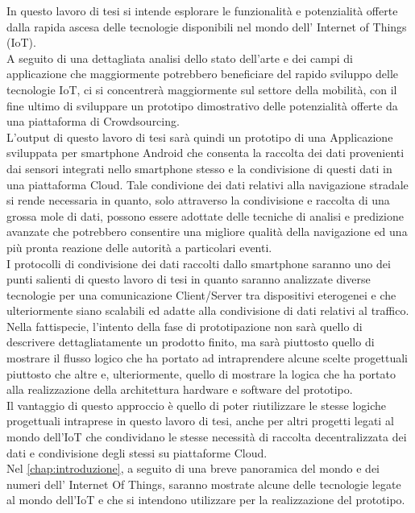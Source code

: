 \documentclass[11pt]{toptesi}
\begin{document}
\sommario
In questo lavoro di tesi si intende esplorare le funzionalità e potenzialità offerte dalla rapida ascesa delle tecnologie disponibili nel mondo dell' Internet of Things (IoT). \\
A seguito di una dettagliata analisi dello stato dell'arte e dei campi di applicazione che maggiormente potrebbero beneficiare del rapido sviluppo delle tecnologie IoT, ci si concentrerà maggiormente sul settore della mobilità, con il fine ultimo di sviluppare un prototipo dimostrativo delle potenzialità offerte da una piattaforma di Crowdsourcing.\\
L'output di questo lavoro di tesi sarà quindi un prototipo di una Applicazione sviluppata per smartphone Android che consenta la raccolta dei dati provenienti dai sensori integrati nello smartphone stesso e la condivisione di questi dati in una piattaforma Cloud. Tale condivione dei dati relativi alla navigazione stradale si rende necessaria in quanto, solo attraverso la condivisione e raccolta di una grossa mole di dati, possono essere adottate delle tecniche di analisi e predizione avanzate che potrebbero consentire una migliore qualità della navigazione ed una più pronta reazione delle autorità a particolari eventi.\\
I protocolli di condivisione dei dati raccolti dallo smartphone saranno uno dei punti salienti di questo lavoro di tesi in quanto saranno analizzate diverse tecnologie per una comunicazione Client/Server tra dispositivi eterogenei e che ulteriormente siano scalabili ed adatte alla condivisione di dati relativi al traffico.\\
Nella fattispecie, l'intento della fase di prototipazione non sarà quello di descrivere dettagliatamente un prodotto finito, ma sarà piuttosto quello di mostrare il flusso logico che ha portato ad intraprendere alcune scelte progettuali piuttosto che altre e, ulteriormente, quello di mostrare la logica che ha portato alla realizzazione della architettura hardware e software del prototipo. \\
Il vantaggio di questo approccio è quello di poter riutilizzare le stesse logiche progettuali intraprese in questo lavoro di tesi, anche per altri progetti legati al mondo dell'IoT che condividano le stesse necessità di raccolta decentralizzata dei dati e condivisione degli stessi su piattaforme Cloud.\\

Nel \autoref{chap:introduzione}, a seguito di una breve panoramica del mondo e dei numeri dell' Internet Of Things, saranno mostrate alcune delle tecnologie legate al mondo dell'IoT e che si intendono utilizzare per la realizzazione del prototipo.\\
\end{document}
